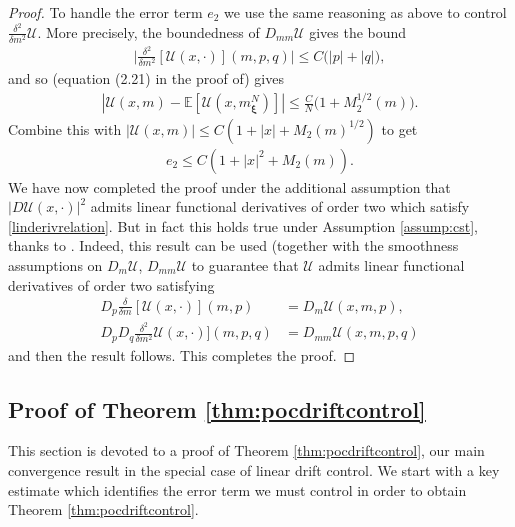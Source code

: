 \documentclass[11pt,reqno]{amsart}
\numberwithin{equation}{section}
\theoremstyle{definition}
\def\E{{\mathbb E}}
\newcommand\cU{\mathcal U}
\def \E{\mathbb{E}}
\begin{document}
\begin{proof}
To handle the error term $e_2$ we use the same reasoning as above to control $\frac{\delta^2}{\delta m^2} \cU$. More precisely, the boundedness of $D_{mm} \cU$ gives the bound
\begin{align*}
\Big|\frac{\delta^2}{\delta m^2} [\cU(x,\cdot)](m,p,q) \Big| \leq C \big(|p| + |q| \big), 
\end{align*}
and so (equation (2.21) in the proof of) \cite[Theorem 2.11]{CST} gives
\begin{align*}
|\cU(x,m) - \E[\cU(x, m_{\bm \xi}^N)]| \leq \frac{C}{N} \big(1 + M_2^{1/2}(m)\big). 
\end{align*}
Combine this with $|\cU(x,m)| \leq C(1 + |x| + M_2(m)^{1/2})$ to get 
\begin{align*}
e_2 \leq C(1 + |x|^2 + M_2(m)). 
\end{align*}
We have now completed the proof under the additional assumption that $|D\cU(x, \cdot)|^2$ admits linear functional derivatives of order two which satisfy \eqref{linderivrelation}. But in fact this holds true under Assumption \ref{assump:cst}, thanks to \cite[Proposition 5.48]{cardelbook1}. Indeed, this result can be used (together with the smoothness assumptions on $D_m\cU$, $D_{mm} \cU$ to guarantee that $ \cU$ admits linear functional derivatives of order two satisfying
\begin{align} \label{linderivrelation1}
D_p \frac{\delta}{\delta m}[\cU(x, \cdot)](m,p) &= D_m  \cU(x,m,p), \nonumber \\
D_p D_q \frac{\delta^2}{\delta m^2} \cU(x, \cdot)](m,p,q) &= D_{mm} \cU(x,m,p,q)
\end{align}
and then the result follows. This completes the proof.
\end{proof}

\subsection{Proof of Theorem \ref{thm:pocdriftcontrol}}
\label{subsec:proofmaindrift}


This section is devoted to a proof of Theorem \ref{thm:pocdriftcontrol}, our main convergence result in the special case of linear drift control. We start with a key estimate which identifies the error term we must control in order to obtain Theorem \ref{thm:pocdriftcontrol}.
\end{document}
